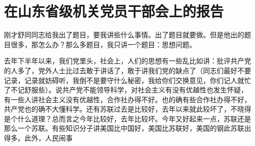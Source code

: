 \section[在山东省级机关党员干部会上的报告（一九五七年三月十八日）]{在山东省级机关党员干部会上的报告}


刚才舒同同志给我出了题目，要我讲些什么事情。出了题目就要做。但是他出的题目很多，那怎么办？那么多题目，我只讲一个题目：思想问题。

去年下半年以来，我们党里头，社会上，人们的思想有一些乱比如讲：批评共产党的人多了，党外人士比过去敢于讲话了，敢于讲我们党的缺点了（同志们最好不要记录，记录就妨碍听，我倒不是要守什么秘密，我给你们交换意见，你们记人就忙了不记舒服些）。说共产党不能领导科学，对社会主义有没有优越性也发生怀疑，有一些人讲社会主义没有优越性，合作社办得不好。也的确有些合作社办得不好，共产党也的确不大懂科学。还有苏联过去是比较好，去年以来就此较坏了，不晓得是个什么道理？总而言之今年比较好，去年比较坏。今年又好起来一点，苏联还是那么一个苏联。有些知识分子讲美国比中国好，美国比苏联好，美国的钢此苏联出得多。此外，人民闹事
